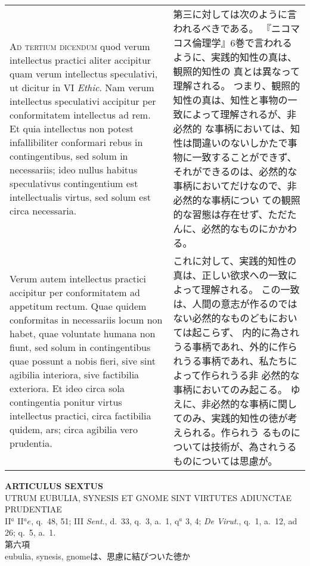 \documentclass[10pt]{jsarticle} %
\begin{document}
\begin{longtable}{p{21em}p{21em}}
\\



{\scshape Ad tertium dicendum} quod verum intellectus practici aliter
 accipitur quam verum intellectus speculativi, ut dicitur in VI
 {\itshape Ethic}. Nam verum intellectus speculativi accipitur per
 conformitatem intellectus ad rem. Et quia intellectus non potest
 infallibiliter conformari rebus in contingentibus, sed solum in
 necessariis; ideo nullus habitus speculativus contingentium est
 intellectualis virtus, sed solum est circa necessaria. 

&

第三に対しては次のように言われるべきである。
『ニコマコス倫理学』6巻で言われるように、実践的知性の真は、観照的知性の
 真とは異なって理解される。
つまり、観照的知性の真は、知性と事物の一致によって理解されるが、非必然的
 な事柄においては、知性は間違いのないしかたで事物に一致することができず、
 それができるのは、必然的な事柄においてだけなので、非必然的な事柄につい
 ての観照的な習態は存在せず、ただたんに、必然的なものにかかわる。

\\

Verum autem
 intellectus practici accipitur per conformitatem ad appetitum
 rectum. Quae quidem conformitas in necessariis locum non habet, quae
 voluntate humana non fiunt, sed solum in contingentibus quae possunt a
 nobis fieri, sive sint agibilia interiora, sive factibilia
 exteriora. Et ideo circa sola contingentia ponitur virtus intellectus
 practici, circa factibilia quidem, ars; circa agibilia vero prudentia.

&

これに対して、実践的知性の真は、正しい欲求への一致によって理解される。
この一致は、人間の意志が作るのではない必然的なものどもにおいては起こらず、
内的に為され
 うる事柄であれ、外的に作られうる事柄であれ、私たちによって作られうる非
 必然的な事柄においてのみ起こる。
ゆえに、非必然的な事柄に関してのみ、実践的知性の徳が考えられる。作られう
 るものについては技術が、為されうるものについては思慮が。


\end{longtable}
\newpage

\begin{center}
 {\Large {\bf ARTICULUS SEXTUS}}\\
 {\large UTRUM EUBULIA, SYNESIS ET GNOME SINT VIRTUTES ADIUNCTAE PRUDENTIAE}\\
 {\footnotesize II$^a$ II${^ae}$, q.~48, 51; III {\itshape Sent.},
 d.~33, q.~3, a.~1, q$^a$ 3, 4; {\itshape De Virut.}, q.~1, a.~12, ad
 26; q.~5, a.~1.}\\
 {\Large 第六項\\eubulia, synesis, gnomeは、思慮に結びついた徳か}
\end{center}
\end{document}
